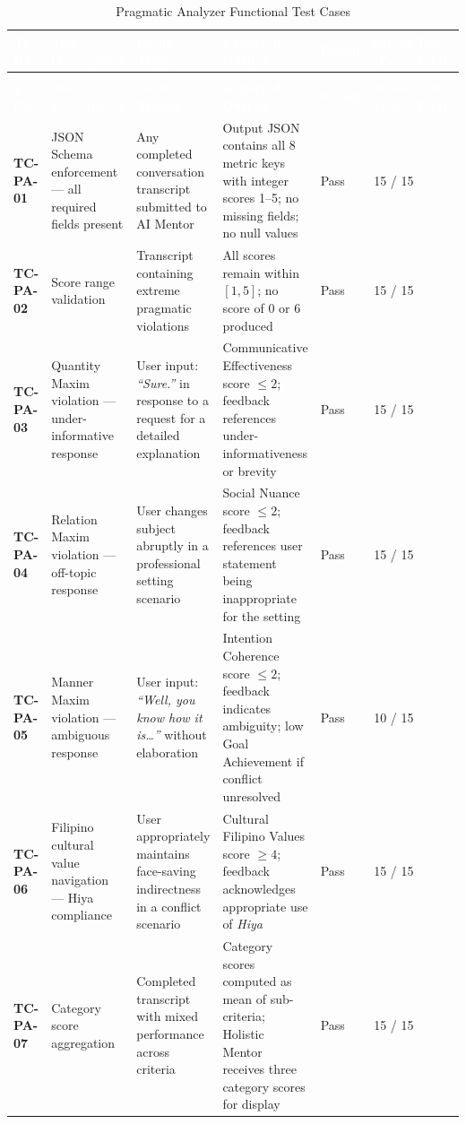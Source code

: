 \begin{longtable}{>{\bfseries}p{1.2cm} p{3.0cm} p{3.5cm} p{4.5cm} p{1.0cm} p{1.5cm}}
\caption{Pragmatic Analyzer Functional Test Cases}
\label{tab:tc-pa} \\
 
\rowcolor{headerblue}
\textcolor{white}{\textbf{TC-PA}} &
\textcolor{white}{\textbf{Test Description}} &
\textcolor{white}{\textbf{Input / Trigger}} &
\textcolor{white}{\textbf{Expected Output}} &
\textcolor{white}{\textbf{Result}} &
\textcolor{white}{\textbf{Stress Test (Pass/Total)}} \\
\endfirsthead
 
\multicolumn{6}{c}{\tablename\ \thetable{} -- continued} \\
\rowcolor{headerblue}
\textcolor{white}{\textbf{TC-PA}} &
\textcolor{white}{\textbf{Test Description}} &
\textcolor{white}{\textbf{Input / Trigger}} &
\textcolor{white}{\textbf{Expected Output}} &
\textcolor{white}{\textbf{Result}} &
\textcolor{white}{\textbf{Stress Test (Pass/Total)}} \\
\endhead
 
\midrule
TC-PA-01 & JSON Schema enforcement --- all required fields present & Any completed conversation transcript submitted to AI Mentor & Output JSON contains all 8 metric keys with integer scores 1--5; no missing fields; no null values & Pass & 15 / 15 \\
\midrule
TC-PA-02 & Score range validation & Transcript containing extreme pragmatic violations & All scores remain within $[1, 5]$; no score of 0 or 6 produced & Pass & 15 / 15 \\
\midrule
TC-PA-03 & Quantity Maxim violation --- under-informative response & User input: \textit{``Sure.''} in response to a request for a detailed explanation & Communicative Effectiveness score $\leq 2$; feedback references under-informativeness or brevity & Pass & 15 / 15 \\
\midrule
TC-PA-04 & Relation Maxim violation --- off-topic response & User changes subject abruptly in a professional setting scenario & Social Nuance score $\leq 2$; feedback references user statement being inappropriate for the setting & Pass & 15 / 15 \\
\midrule
TC-PA-05 & Manner Maxim violation --- ambiguous response & User input: \textit{``Well, you know how it is\ldots''} without elaboration & Intention Coherence score $\leq 2$; feedback indicates ambiguity; low Goal Achievement if conflict unresolved & Pass & 10 / 15 \\
\midrule
TC-PA-06 & Filipino cultural value navigation --- Hiya compliance & User appropriately maintains face-saving indirectness in a conflict scenario & Cultural Filipino Values score $\geq 4$; feedback acknowledges appropriate use of \textit{Hiya} & Pass & 15 / 15 \\
\midrule
TC-PA-07 & Category score aggregation & Completed transcript with mixed performance across criteria & Category scores computed as mean of sub-criteria; Holistic Mentor receives three category scores for display & Pass & 15 / 15 \\
\bottomrule
\end{longtable}

